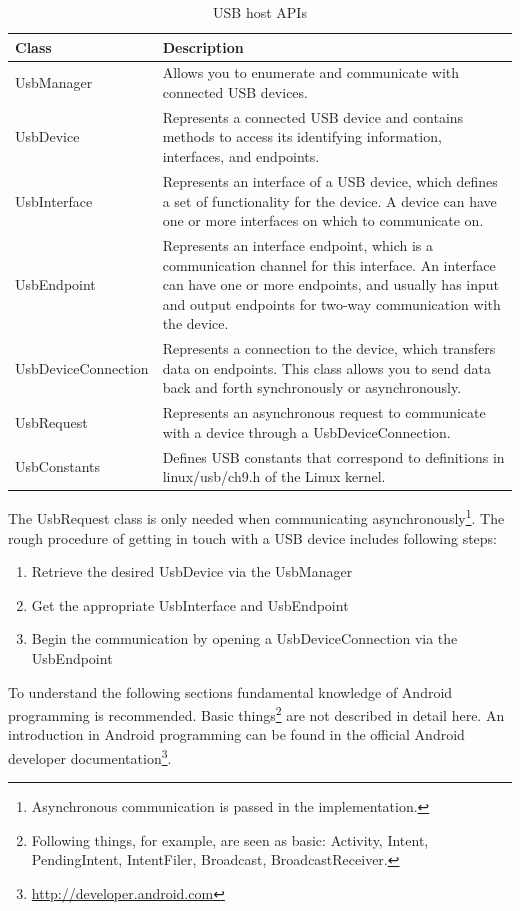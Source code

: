 \begin{table}[ht]
\caption{USB host APIs \cite{android_usb_host}}
\centering
\begin{tabular}{|l|p{10cm}|}
\hline\hline
\textbf{Class} & \textbf{Description} \\ \hline
UsbManager & Allows you to enumerate and communicate with connected USB devices. \\ \hline
UsbDevice & Represents a connected USB device and contains methods to access its identifying information, interfaces, and endpoints. \\ \hline
UsbInterface & Represents an interface of a USB device, which defines a set of functionality for the device. A device can have one or more interfaces on which to communicate on. \\ \hline
UsbEndpoint & Represents an interface endpoint, which is a communication channel for this interface. An interface can have one or more endpoints, and usually has input and output endpoints for two-way communication with the device. \\ \hline
UsbDeviceConnection & Represents a connection to the device, which transfers data on endpoints. This class allows you to send data back and forth synchronously or asynchronously. \\ \hline
UsbRequest & Represents an asynchronous request to communicate with a device through a UsbDeviceConnection. \\ \hline
UsbConstants & Defines USB constants that correspond to definitions in linux/usb/ch9.h of the Linux kernel. \\ \hline
\end{tabular}
\label{table:host_api}
\end{table}

The UsbRequest class is only needed when communicating asynchronously\footnote{Asynchronous communication is passed in the implementation.}. The rough procedure of getting in touch with a USB device includes following steps:

\begin{enumerate}
\item Retrieve the desired UsbDevice via the UsbManager
\item Get the appropriate UsbInterface and UsbEndpoint
\item Begin the communication by opening a UsbDeviceConnection via the UsbEndpoint
\end{enumerate}

To understand the following sections fundamental knowledge of Android programming is recommended. Basic things\footnote{Following things, for example, are seen as basic: Activity, Intent, PendingIntent, IntentFiler, Broadcast, BroadcastReceiver.} are not described in detail here. An introduction in Android programming can be found in the official Android developer documentation\footnote{\url{http://developer.android.com}}.

